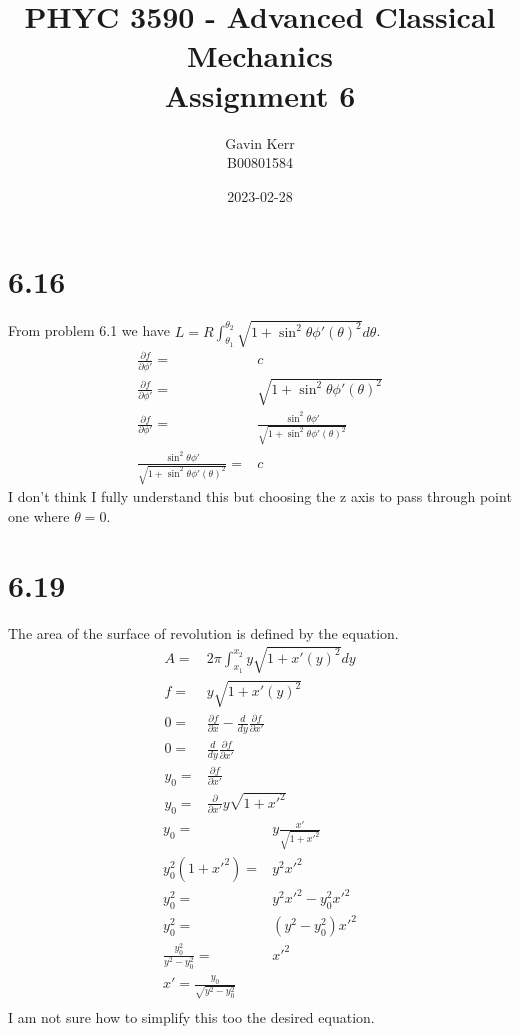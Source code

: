 \documentclass[12pt, a4paper]{article}
\title{PHYC 3590 - Advanced Classical Mechanics\\Assignment 6}
\author{Gavin Kerr\\B00801584}
\date{2023-02-28}
\begin{document}
\maketitle

\section{6.16}
From problem 6.1 we have $L = R\int_{\theta_1}^{\theta_2}\sqrt{1+\sin^2\theta\phi'(\theta)^2}d\theta$.
\begin{align*}
\frac{\partial f}{\partial\phi'} =& c
\\
\frac{\partial f}{\partial\phi'} =& \sqrt{1+\sin^2\theta\phi'(\theta)^2}
\\
\frac{\partial f}{\partial\phi'} =& \frac{\sin^2\theta\phi'}{\sqrt{1+\sin^2\theta\phi'(\theta)^2}}
\\
\frac{\sin^2\theta\phi'}{\sqrt{1+\sin^2\theta\phi'(\theta)^2}} =& c
\end{align*}
I don't think I fully understand this but choosing the z axis to pass through point one where $\theta = 0$.


\section{6.19}
The area of the surface of revolution is defined by the equation. 
\begin{align*}
A =& 2\pi \int_{x_1}^{x_2}y\sqrt{1+x'(y)^2}dy
\\
f =& y\sqrt{1+x'(y)^2}
\\
0 =& {\frac {\partial f}{\partial x}}-{\frac{d }{d y}}{\frac {\partial f}{\partial x'}}
\\
0 =& \frac{d}{dy}\frac{\partial f}{\partial x'}
\\
y_0 =& \frac{\partial f}{\partial x'}
\\
y_0 =& \frac{\partial }{\partial x'}y\sqrt{1+x'^2}
\end{align*}
\begin{align*}
y_0 =& y\frac{x'}{\sqrt{1+x'^2}}
\\
y_0^2(1+x'^2) =& y^2x'^2
\\
y_0^2 =& y^2x'^2 - y_0^2x'^2
\\
y_0^2 =& (y^2 - y_0^2)x'^2
\\
\frac{y_0^2}{y^2 - y_0^2} =& x'^2
\\
x' = \frac{y_0}{\sqrt{y^2 - y_0^2}}
\\
\end{align*}
I am not sure how to simplify this too the desired equation.
\end{document}
